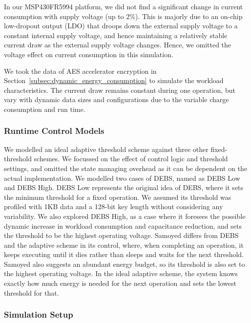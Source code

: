 

In our MSP430FR5994 platform, we did not find a significant change in current consumption with supply voltage (up to 2\%). 
This is majorly due to an on-chip low-dropout output (LDO) that droops down the external supply voltage to a constant internal supply voltage, and hence maintaining a relatively stable current draw as the external supply voltage changes. 
Hence, we omitted the voltage effect on current consumption in this simulation. 

We took the data of AES accelerator encryption in Section~\ref{subsec:dynamic_energy_consumption} to simulate the workload characteristics. 
The current draw remains constant during one operation, but vary with dynamic data sizes and configurations due to the variable charge consumption and run time.

\subsubsection{Runtime Control Models}

We modelled an ideal adaptive threshold scheme against three other fixed-threshold schemes.
We focussed on the effect of control logic and threshold settings, and omitted the state managing overhead as it can be dependent on the actual implementation. 
We modelled two cases of DEBS, named as DEBS Low and DEBS High.
DEBS Low represents the original idea of DEBS, where it sets the minimum threshold for a fixed operation.  
We assumed its threshold was profiled with 1KB data and a 128-bit key length without considering any variability. 
We also explored DEBS High, as a case where it foresees the possible dynamic increase in workload consumption and capacitance reduction, and sets the threshold to be the highest operating voltage.
Samoyed differs from DEBS and the adaptive scheme in its control, where, when completing an operation, it keeps executing until it dies rather than sleeps and waits for the next threshold.
Samoyed also suggests an abundant energy budget, so its threshold is also set to the highest operating voltage.
In the ideal adaptive scheme, the system knows exactly how much energy is needed for the next operation and sets the lowest threshold for that. 

\subsubsection{Simulation Setup}

